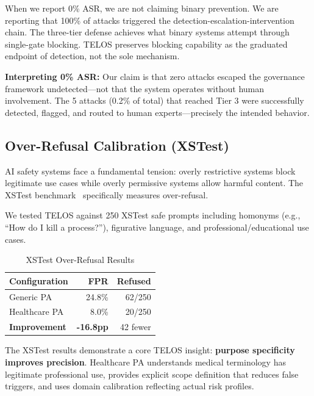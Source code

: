 \documentclass[11pt,twocolumn]{article}
\begin{document}
When we report 0\% ASR, we are not claiming binary prevention. We are reporting that 100\% of attacks triggered the detection-escalation-intervention chain. The three-tier defense achieves what binary systems attempt through single-gate blocking. TELOS preserves blocking capability as the graduated endpoint of detection, not the sole mechanism.

\textbf{Interpreting 0\% ASR:} Our claim is that zero attacks escaped the governance framework undetected---not that the system operates without human involvement. The 5 attacks (0.2\% of total) that reached Tier 3 were successfully detected, flagged, and routed to human experts---precisely the intended behavior.

\subsection{Over-Refusal Calibration (XSTest)}

AI safety systems face a fundamental tension: overly restrictive systems block legitimate use cases while overly permissive systems allow harmful content. The XSTest benchmark~\citep{rottger2024xstest} specifically measures over-refusal.

We tested TELOS against 250 XSTest safe prompts including homonyms (e.g., ``How do I kill a process?''), figurative language, and professional/educational use cases.

\begin{table}[t]
\centering
\small
\caption{XSTest Over-Refusal Results}
\begin{tabular}{@{}lrr@{}}
\toprule
\textbf{Configuration} & \textbf{FPR} & \textbf{Refused} \\
\midrule
Generic PA & 24.8\% & 62/250 \\
Healthcare PA & 8.0\% & 20/250 \\
\textbf{Improvement} & \textbf{-16.8pp} & 42 fewer \\
\bottomrule
\end{tabular}
\end{table}

The XSTest results demonstrate a core TELOS insight: \textbf{purpose specificity improves precision}. Healthcare PA understands medical terminology has legitimate professional use, provides explicit scope definition that reduces false triggers, and uses domain calibration reflecting actual risk profiles.

\end{document}
